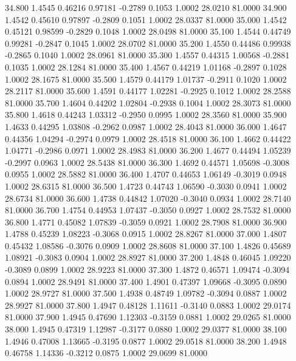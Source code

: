   34.800   1.4545   0.46216   0.97181  -0.2789   0.1053   1.0002  28.0210  81.0000
  34.900   1.4542   0.45610   0.97897  -0.2809   0.1051   1.0002  28.0337  81.0000
  35.000   1.4542   0.45121   0.98599  -0.2829   0.1048   1.0002  28.0498  81.0000
  35.100   1.4544   0.44749   0.99281  -0.2847   0.1045   1.0002  28.0702  81.0000
  35.200   1.4550   0.44486   0.99938  -0.2865   0.1040   1.0002  28.0961  81.0000
  35.300   1.4557   0.44315   1.00568  -0.2881   0.1035   1.0002  28.1284  81.0000
  35.400   1.4567   0.44219   1.01168  -0.2897   0.1028   1.0002  28.1675  81.0000
  35.500   1.4579   0.44179   1.01737  -0.2911   0.1020   1.0002  28.2117  81.0000
  35.600   1.4591   0.44177   1.02281  -0.2925   0.1012   1.0002  28.2588  81.0000
  35.700   1.4604   0.44202   1.02804  -0.2938   0.1004   1.0002  28.3073  81.0000
  35.800   1.4618   0.44243   1.03312  -0.2950   0.0995   1.0002  28.3560  81.0000
  35.900   1.4633   0.44295   1.03808  -0.2962   0.0987   1.0002  28.4043  81.0000
  36.000   1.4647   0.44356   1.04294  -0.2974   0.0979   1.0002  28.4518  81.0000
  36.100   1.4662   0.44422   1.04771  -0.2986   0.0971   1.0002  28.4983  81.0000
  36.200   1.4677   0.44494   1.05239  -0.2997   0.0963   1.0002  28.5438  81.0000
  36.300   1.4692   0.44571   1.05698  -0.3008   0.0955   1.0002  28.5882  81.0000
  36.400   1.4707   0.44653   1.06149  -0.3019   0.0948   1.0002  28.6315  81.0000
  36.500   1.4723   0.44743   1.06590  -0.3030   0.0941   1.0002  28.6734  81.0000
  36.600   1.4738   0.44842   1.07020  -0.3040   0.0934   1.0002  28.7140  81.0000
  36.700   1.4754   0.44953   1.07437  -0.3050   0.0927   1.0002  28.7532  81.0000
  36.800   1.4771   0.45082   1.07839  -0.3059   0.0921   1.0002  28.7908  81.0000
  36.900   1.4788   0.45239   1.08223  -0.3068   0.0915   1.0002  28.8267  81.0000
  37.000   1.4807   0.45432   1.08586  -0.3076   0.0909   1.0002  28.8608  81.0000
  37.100   1.4826   0.45689   1.08921  -0.3083   0.0904   1.0002  28.8927  81.0000
  37.200   1.4848   0.46045   1.09220  -0.3089   0.0899   1.0002  28.9223  81.0000
  37.300   1.4872   0.46571   1.09474  -0.3094   0.0894   1.0002  28.9491  81.0000
  37.400   1.4901   0.47397   1.09668  -0.3095   0.0890   1.0002  28.9727  81.0000
  37.500   1.4938   0.48749   1.09782  -0.3094   0.0887   1.0002  28.9927  81.0000
  37.800   1.4947   0.48128   1.11611  -0.3140   0.0883   1.0002  29.0174  81.0000
  37.900   1.4945   0.47690   1.12303  -0.3159   0.0881   1.0002  29.0265  81.0000
  38.000   1.4945   0.47319   1.12987  -0.3177   0.0880   1.0002  29.0377  81.0000
  38.100   1.4946   0.47008   1.13665  -0.3195   0.0877   1.0002  29.0518  81.0000
  38.200   1.4948   0.46758   1.14336  -0.3212   0.0875   1.0002  29.0699  81.0000
